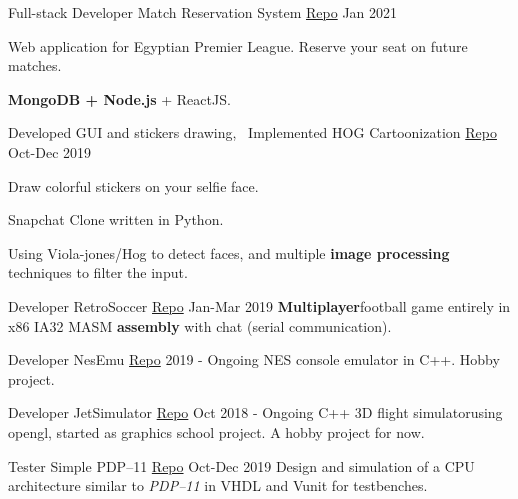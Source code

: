 \begin{cventries}
  \cventry
    {Full-stack Developer} %
    {Match Reservation System \tiny{\href{https://github.com/mido3ds/match-reservation-system}{Repo}}} %
    {} %
    {Jan 2021} %
    {
      \begin{cvitems} %
        \item {Web application for Egyptian Premier League. Reserve your seat on future matches.}
        \item {\textbf{MongoDB + Node.js} + ReactJS.}
      \end{cvitems}
    }

  \cventry
    {Developed GUI and stickers drawing, ~Implemented HOG} %
    {Cartoonization \tiny{\href{http://github.com/Abdulrahman-Khalid/Cartoonization/}{Repo}}} %
    {} %
    {Oct-Dec 2019} %
    {
      \begin{cvitems} %
        \item {Draw colorful stickers on your selfie face.}
        \item {Snapchat Clone written in Python.}
        \item {Using ​Viola-jones/Hog ​to detect faces, and multiple \textbf{image processing} techniques to filter the input.}
      \end{cvitems}
    }

  \cventry
    {Developer} %
    {RetroSoccer \tiny{\href{https://github.com/mido3ds/retrosoccer}{Repo}}} %
    {} %
    {Jan-Mar 2019} %
    {
      {\textbf{Multiplayer​} football ​game​ entirely in x86 IA32 MASM \textbf{​assembly​} with chat (serial communication).}
    }

    \cventry
    {Developer} %
    {NesEmu \tiny{\href{https://github.com/mido3ds/nesemu}{Repo}}} %
    {} %
    {2019 - Ongoing} %
    {
      NES console ​emulator​ in C++. Hobby project.
    }

  \cventry
    {Developer} %
    {JetSimulator \tiny{\href{https://github.com/mido3ds/JetSimulator}{Repo}}} %
    {} %
    {Oct 2018 - Ongoing} %
    {
      {C++ 3D​ ​flight simulator​ using opengl, started as graphics school project. A hobby project for now.}
    }

    \cventry
    {Tester} %
    {Simple PDP--11 \tiny{\href{https://github.com/mido3ds/simple-pdp11}{Repo}}} %
    {} %
    {Oct-Dec 2019} %
    {
      Design and simulation of a CPU architecture similar to \emph{PDP--11} in VHDL and Vunit for testbenches.
    }


\end{cventries}
